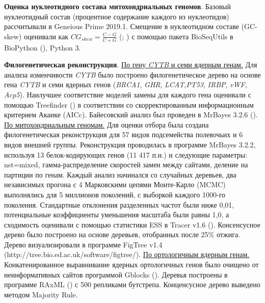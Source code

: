 \textbf{Оценка нуклеотидного состава митохондриальных геномов}. Базовый нуклеотидный состав (процентное содержание каждого из нуклеотидов) рассчитывали в Geneious Prime 2019.1. Смещение в нуклеотидном составе (GC-skew) оценивали как $CG_{skew} = \frac{C - G}{C + G}$ (\cite{Arabi2010}; \cite{Hassanin2005}) с помощью пакета BioSeqUtils в BioPython (\cite{Cock2009}), Python 3. 

\textbf{Филогенетическая реконструкция}. \underline{По гену \textit{CYTB} и семи ядерным генам.} Для анализа изменчивости \textit{CYTB} было построено филогенетическое дерево на основе гена \textit{CYTB} и семи ядерных генов (\textit{BRCA1}, \textit{GHR}, \textit{LCAT},\textit{PT53}, \textit{IRBP}, \textit{vWF}, \textit{Acp5}). Наилучшее соответствие моделей замены для каждого гена оценивали с помощью Treefinder (\cite{Jobb2004}) в соответствии со скорректированным информационным критерием Акаике (AICc). Байесовский анализ был проведен в MrBayes 3.2.6 (\cite{Ronquist2012}). \underline{По митохондриальным геномам.} Для оценки отбора была создана филогенетическая реконструкция для 57 видов подсемейства полевочьих и 6 видов внешней группы. Реконструкция проводилась в программе MrBayes 3.2.2, используя 13 белок-кодирующих генов (11 417 п.н.) и следующие параметры: nst=mixed, гамма-распределение скоростей замен между сайтами, деление на партиции по генам. Каждый анализ начинался со случайных деревьев, два независимых прогона с 4 Марковскими цепями Монте-Карло (MCMC) выполнялись для 5 миллионов поколений, с выборкой каждого 1000-го поколения. Стандартные отклонения разделенных частот были ниже 0,01, потенциальные коэффициенты уменьшения масштаба были равны 1,0, а сходимость оценивали с помощью статистики ESS в Tracer v1.6 (\cite{Rambaut2014}). Консенсусное дерево было построено на основе деревьев, отобранных после 25\% отжига. Дерево визуализировали в программе FigTree v1.4 (http://tree.bio.ed.ac.uk/software/figtree/). \underline{По ортологичным ядерным генам.} Конкатенированное выравнивание ядерных ортологичных генов было очищено от неинформативных сайтов программой Gblocks (\cite{Castresana2000}). Деревья построены в программе RAxML (\cite{Stamatakis2014}) с 500 репликами бутстрепа. Конценсусное дерево выведено методом Majority Rule. 

